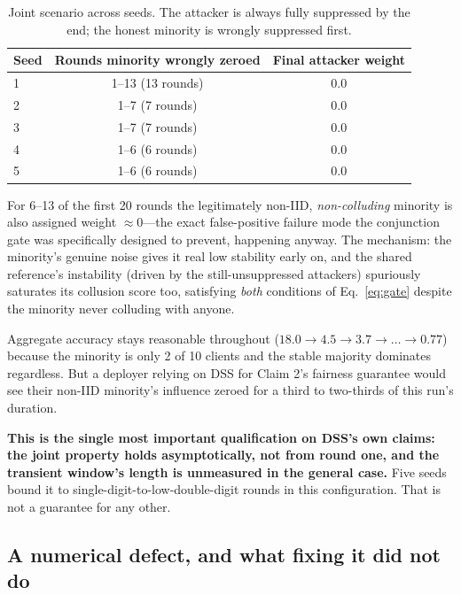 \documentclass[11pt,a4paper]{article}
\begin{document}
\begin{table}[htbp]
\centering
\small
\caption{Joint scenario across seeds. The attacker is always fully
suppressed by the end; the honest minority is wrongly suppressed first.}
\label{tab:joint}
\begin{tabular}{lcc}
\toprule
\textbf{Seed} & \textbf{Rounds minority wrongly zeroed} & \textbf{Final attacker weight} \\
\midrule
1 & 1--13 (13 rounds) & 0.0 \\
2 & 1--7 \phantom{0}(7 rounds)  & 0.0 \\
3 & 1--7 \phantom{0}(7 rounds)  & 0.0 \\
4 & 1--6 \phantom{0}(6 rounds)  & 0.0 \\
5 & 1--6 \phantom{0}(6 rounds)  & 0.0 \\
\bottomrule
\end{tabular}
\end{table}

For 6--13 of the first 20 rounds the legitimately non-IID,
\emph{non-colluding} minority is also assigned weight ${\approx}0$---the
exact false-positive failure mode the conjunction gate was specifically
designed to prevent, happening anyway. The mechanism: the minority's
genuine noise gives it real low stability early on, and the shared
reference's instability (driven by the still-unsuppressed attackers)
spuriously saturates its collusion score too, satisfying \emph{both}
conditions of Eq.~\ref{eq:gate} despite the minority never colluding with
anyone.

Aggregate accuracy stays reasonable throughout ($18.0 \rightarrow 4.5
\rightarrow 3.7 \rightarrow \dots \rightarrow 0.77$) because the minority
is only 2 of 10 clients and the stable majority dominates regardless. But
a deployer relying on DSS for Claim 2's fairness guarantee would see their
non-IID minority's influence zeroed for a third to two-thirds of this
run's duration.

\textbf{This is the single most important qualification on DSS's own
claims: the joint property holds asymptotically, not from round one, and
the transient window's length is unmeasured in the general case.} Five
seeds bound it to single-digit-to-low-double-digit rounds in this
configuration. That is not a guarantee for any other.

\subsection{A numerical defect, and what fixing it did not do}
\label{sec:numerical}
\end{document}
